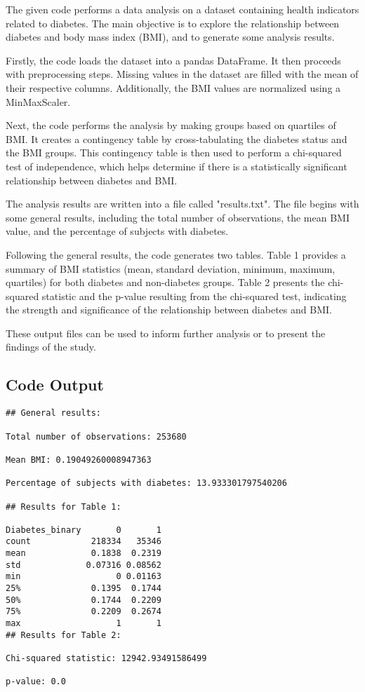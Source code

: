 \documentclass[11pt]{article}
\begin{document}
The given code performs a data analysis on a dataset containing health indicators related to diabetes. The main objective is to explore the relationship between diabetes and body mass index (BMI), and to generate some analysis results.

Firstly, the code loads the dataset into a pandas DataFrame. It then proceeds with preprocessing steps. Missing values in the dataset are filled with the mean of their respective columns. Additionally, the BMI values are normalized using a MinMaxScaler.

Next, the code performs the analysis by making groups based on quartiles of BMI. It creates a contingency table by cross-tabulating the diabetes status and the BMI groups. This contingency table is then used to perform a chi-squared test of independence, which helps determine if there is a statistically significant relationship between diabetes and BMI.

The analysis results are written into a file called "results.txt". The file begins with some general results, including the total number of observations, the mean BMI value, and the percentage of subjects with diabetes. 

Following the general results, the code generates two tables. Table 1 provides a summary of BMI statistics (mean, standard deviation, minimum, maximum, quartiles) for both diabetes and non-diabetes groups. Table 2 presents the chi-squared statistic and the p-value resulting from the chi-squared test, indicating the strength and significance of the relationship between diabetes and BMI.

These output files can be used to inform further analysis or to present the findings of the study.

\subsection*{Code Output}

\begin{Verbatim}[tabsize=4]
## General results:

Total number of observations: 253680

Mean BMI: 0.19049260008947363

Percentage of subjects with diabetes: 13.933301797540206

## Results for Table 1:

Diabetes_binary       0       1
count            218334   35346
mean             0.1838  0.2319
std             0.07316 0.08562
min                   0 0.01163
25%              0.1395  0.1744
50%              0.1744  0.2209
75%              0.2209  0.2674
max                   1       1
## Results for Table 2:

Chi-squared statistic: 12942.93491586499

p-value: 0.0

\end{Verbatim}
\end{document}

